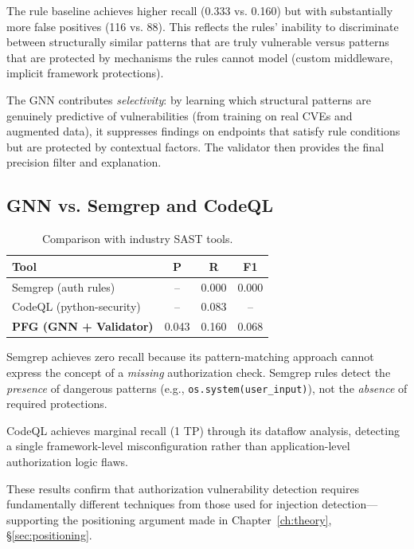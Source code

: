 The rule baseline achieves higher recall (0.333 vs. 0.160) but with substantially more false positives (116 vs. 88). This reflects the rules' inability to discriminate between structurally similar patterns that are truly vulnerable versus patterns that are protected by mechanisms the rules cannot model (custom middleware, implicit framework protections).

The GNN contributes \emph{selectivity}: by learning which structural patterns are genuinely predictive of vulnerabilities (from training on real CVEs and augmented data), it suppresses findings on endpoints that satisfy rule conditions but are protected by contextual factors. The validator then provides the final precision filter and explanation.

\subsection{GNN vs. Semgrep and CodeQL}

\begin{table}[htbp]
\centering
\caption{Comparison with industry SAST tools.}
\label{tab:sast-comparison}
\begin{tabular}{@{}lccc@{}}
\toprule
\textbf{Tool} & \textbf{P} & \textbf{R} & \textbf{F1} \\
\midrule
Semgrep (auth rules) & -- & 0.000 & 0.000 \\
CodeQL (python-security) & -- & 0.083 & -- \\
\textbf{PFG (GNN + Validator)} & 0.043 & 0.160 & 0.068 \\
\bottomrule
\end{tabular}
\end{table}

Semgrep achieves zero recall because its pattern-matching approach cannot express the concept of a \emph{missing} authorization check. Semgrep rules detect the \emph{presence} of dangerous patterns (e.g., \texttt{os.system(user\_input)}), not the \emph{absence} of required protections.

CodeQL achieves marginal recall (1 TP) through its dataflow analysis, detecting a single framework-level misconfiguration rather than application-level authorization logic flaws.

These results confirm that authorization vulnerability detection requires fundamentally different techniques from those used for injection detection—supporting the positioning argument made in Chapter~\ref{ch:theory}, \S\ref{sec:positioning}.

